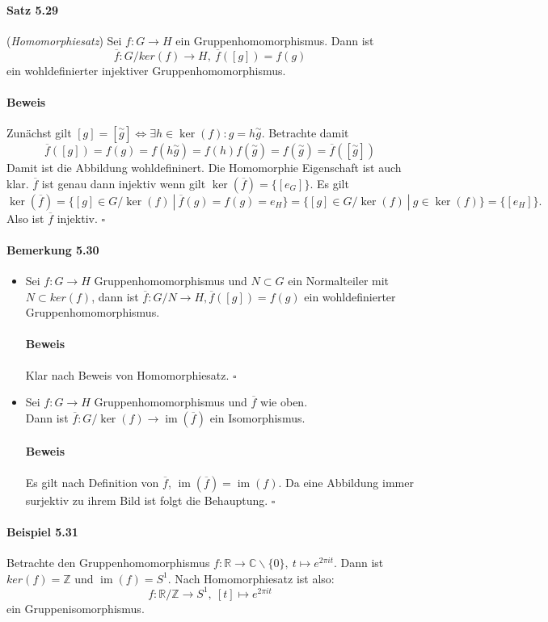 \documentclass{scrartcl}
\newcommand{\s}[1]{\overset{\sim}{#1}} %
\newcommand{\q}[1]{\overline{#1}} %
\newcommand{\im}{\operatorname{im}}
\begin{document}
\paragraph{Satz 5.29} (\textit{Homomorphiesatz}) Sei $f: G \to H$ ein
Gruppenhomomorphismus. Dann ist
\[
  \overline{f}: G/ker(f) \to H,~\overline{f}([g]) = f(g)
\]
ein wohldefinierter injektiver Gruppenhomomorphismus. \\
\paragraph{Beweis}
Zunächst gilt $[g]=[\s{g}] \iff \exists h \in \ker(f): g = h\s{g}$.
Betrachte damit
\[
  \q{f}([g])=f(g)=f(h\s{g})=f(h)f(\s{g})=f(\s{g})=\q{f}([\s{g}])
\]
Damit ist die Abbildung wohldefininert. Die Homomorphie Eigenschaft ist auch
klar. $\q{f}$ ist genau dann injektiv wenn
gilt $\ker(\q{f})=\{[e_G]\}$. Es gilt
\[
  \ker(\q{f})=\{[g] \in G/\ker(f)~|~\q{f}(g)=f(g)=e_H\}
  =\{[g] \in G/\ker(f)~|~g \in \ker(f)\}
  =\{[e_H]\}.
\]
Also ist $\q{f}$ injektiv.
\hfill $\square$

\paragraph{Bemerkung 5.30}
\begin{itemize}
\item Sei $f: G \to H$ Gruppenhomomorphismus und $N \subset
  G$ ein Normalteiler mit $N \subset ker(f)$, dann ist $\overline{f}: G/N \to H,
  \overline{f}([g]) = f(g)$ ein wohldefinierter Gruppenhomomorphismus.
  \paragraph{Beweis}
  Klar nach Beweis von Homomorphiesatz.
  \hfill $\square$

\item Sei $f: G \to H$ Gruppenhomomorphismus und $\overline{f}$ wie oben. \\
  Dann ist $\q{f}:G/\ker(f) \to \im(\overline{f})$ ein Isomorphismus.
  \paragraph{Beweis}
  Es gilt nach Definition von $\q{f}$, $\im(\q{f})=\im(f)$. Da eine Abbildung
  immer surjektiv zu ihrem Bild ist folgt die Behauptung.
  \hfill $\square$
  
\end{itemize}

\paragraph{Beispiel 5.31} Betrachte den Gruppenhomomorphismus $f: \mathbb{R} \to
\mathbb{C}\backslash\{0\},~t \mapsto e^{2\pi it}$. Dann ist $ker(f) =
\mathbb{Z}$ und $\im(f) = S^1$. Nach Homomorphiesatz ist also:
\[
  f: \mathbb{R}/\mathbb{Z} \to S^1,~[t] \mapsto e^{2\pi it}
\]
ein Gruppenisomorphismus.
\end{document}
